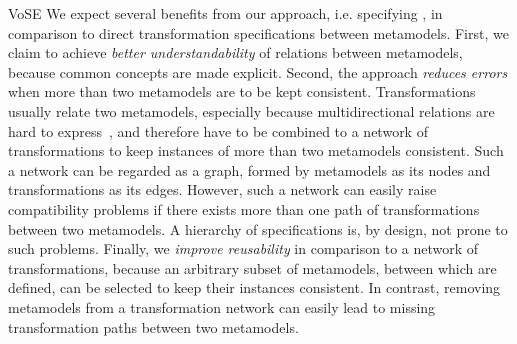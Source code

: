 \begin{copiedFrom}{VoSE}
We expect several benefits from our approach, i.e. specifying \commonalities, in comparison to direct transformation specifications between metamodels.
First, we claim to achieve \emph{better understandability} of relations between metamodels, because common concepts are made explicit. %
Second, the approach \emph{reduces errors} when more than two metamodels are to be kept consistent.
Transformations usually relate two metamodels, especially because multidirectional relations are hard to express~\cite{stevens2020BidirectionalTransformationLarge-SoSym},
and therefore have to be combined to a network of transformations to keep instances of more than two metamodels consistent.
Such a network can be regarded as a graph, formed by metamodels as its nodes and transformations as its edges.
However, such a network can easily raise compatibility problems if there exists more than one path of transformations between two metamodels.
A hierarchy of \commonality specifications is, by design, not prone to such problems.
Finally, we \emph{improve reusability} in comparison to a network of transformations, %
because an arbitrary subset of metamodels, between which \commonalities are defined, can be selected to keep their instances consistent.
In contrast, removing metamodels from a transformation network can easily lead to missing transformation paths between two metamodels.


\end{copiedFrom} %


